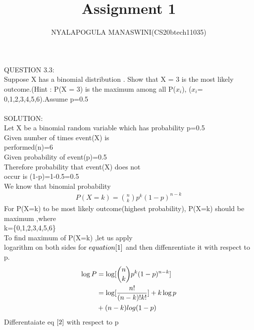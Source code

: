\documentclass{assignment}
\begin{document}
\title{Assignment 1}
\author{NYALAPOGULA MANASWINI(CS20btech11035)}
\maketitle
\begin{multicols}{2}

QUESTION 3.3:\\
Suppose X has a binomial
 distribution . Show that X = 3 is the most likely outcome.(Hint : P(X = 3) is the maximum among all P($x_i$), ($x_i$= 0,1,2,3,4,5,6).Assume p=0.5\\ 
 \\
SOLUTION:\\
Let X be a binomial random variable which has probability p=0.5\\
Given number of times event(X) is\\
 performed(n)=6\\
Given probability of event(p)=0.5\\
Therefore probability that event(X) does not \\occur is
(1-p)=1-0.5=0.5\\
We know that binomial probability\\
\begin{align}
P(X=k)= \binom{n}{k}p^k({1-p})^{n-k}  \label{1} 
\end{align}
For P(X=k) to be most likely outcome(highest probability),
P(X=k) should be maximum ,where\\
 k=\{0,1,2,3,4,5,6\}\\
To find maximum of P(X=k) ,let us  apply \\logarithm on both sides for $equation\eqref{1}$ and then diffenrentiate it with respect
to p.
\begin{align}
\log P&=\log[\binom{n}{k}p^k({1-p})^{n-k}]  \\
&=\log[\frac{n!}{(n-k)!k!}]+k \log p \notag \\
 &+(n-k)log (1-p) \label{2}
\end{align}
Differentaiate eq $\eqref{2}$ with respect to p


\end{multicols}
\end{document}
